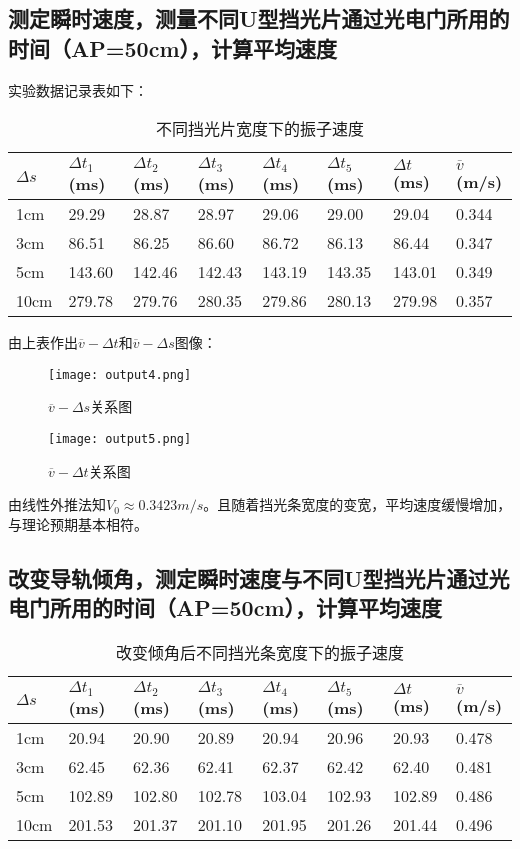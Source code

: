 \documentclass[UTF-8,twoside,cs4size]{ctexart}
\begin{document}
\subsection{测定瞬时速度，测量不同U型挡光片通过光电门所用的时间（AP=50cm），计算平均速度}
实验数据记录表如下：
\begin{table}[!h]
    \centering
    \renewcommand\arraystretch{1.7}
    \begin{tabular}{|l|l|l|l|l|l|l|l|}
        \hline
        $\Delta s$&$\Delta t_1$(ms) &$\Delta t_2$(ms)&$\Delta t_3$(ms) &$\Delta t_4$(ms)&$\Delta t_5$ (ms)&$\Delta t$(ms)&$\overline{v}$(m/s)\\\hline
        1cm&29.29&28.87&28.97&29.06&29.00&29.04&0.344 \\\hline
        3cm&86.51&86.25&86.60&86.72&86.13&86.44&0.347\\\hline
        5cm&143.60&142.46&142.43&143.19&143.35&143.01&0.349\\\hline
        10cm&279.78&279.76&280.35&279.86&280.13&279.98&0.357\\\hline
    \end{tabular}
    \caption{不同挡光片宽度下的振子速度}
\end{table}

由上表作出$\overline{v} - \Delta t$和$\overline{v} - \Delta s$图像：

\begin{figure}[!h]
    \centering
    \texttt{[image: output4.png]}
    \caption{$\overline{v} - \Delta s$关系图}
\end{figure}
\begin{figure}[!h]
    \centering
    \texttt{[image: output5.png]}
    \caption{$\overline{v} - \Delta t$关系图}
\end{figure}
由线性外推法知$V_0 \approx 0.3423 m/s$。且随着挡光条宽度的变宽，平均速度缓慢增加，与理论预期基本相符。

\subsection{改变导轨倾角，测定瞬时速度与不同U型挡光片通过光电门所用的时间（AP=50cm），计算平均速度}
\begin{table}[!h]
    \centering
    \renewcommand\arraystretch{1.7}
    \begin{tabular}{|l|l|l|l|l|l|l|l|}
        \hline
        $\Delta s$&$\Delta t_1$(ms) &$\Delta t_2$(ms)&$\Delta t_3$(ms) &$\Delta t_4$(ms)&$\Delta t_5$ (ms)&$\Delta t$(ms)&$\overline{v}$(m/s)\\\hline
        1cm&20.94&20.90&20.89&20.94&20.96&20.93&0.478 \\\hline
        3cm&62.45&62.36&62.41&62.37&62.42&62.40&0.481\\\hline
        5cm&102.89&102.80&102.78&103.04&102.93&102.89&0.486\\\hline
        10cm&201.53&201.37&201.10&201.95&201.26&201.44&0.496\\\hline
    \end{tabular}
    \caption{改变倾角后不同挡光条宽度下的振子速度}
\end{table}
\end{document}
